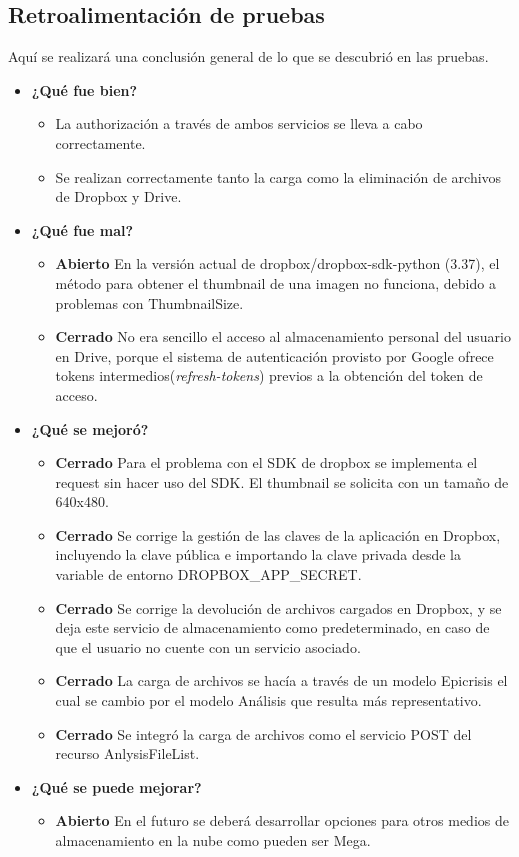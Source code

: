 \subsection{Retroalimentación de pruebas}
Aquí se realizará una conclusión general de lo que se descubrió en las pruebas.
	\begin{itemize}
		\item \textbf{¿Qué fue bien?}
        	\begin{itemize}
				\item La authorización a través de ambos servicios se lleva a cabo correctamente.
				\item Se realizan correctamente tanto la carga como la eliminación de archivos de Dropbox y Drive.
			\end{itemize}
		\item \textbf{¿Qué fue mal?}
        	\begin{itemize}
	          \item \textbf{Abierto} En la versión actual de dropbox/dropbox-sdk-python (3.37), el método para obtener el thumbnail de una imagen no funciona, debido a problemas con ThumbnailSize.
	          \item \textbf{Cerrado} No era sencillo el acceso al almacenamiento personal del usuario en Drive, porque el sistema de autenticación provisto por Google ofrece tokens intermedios(\textit{refresh-tokens}) previos a la obtención del token de acceso.
			\end{itemize}

   		\item \textbf{¿Qué se mejoró?}
        	\begin{itemize}
                \item \textbf{Cerrado} Para el problema con el SDK de dropbox se implementa el request sin hacer uso del SDK. El thumbnail se solicita con un tamaño de 640x480.
                \item \textbf{Cerrado} Se corrige la gestión de las claves de la aplicación en Dropbox, incluyendo la clave pública e importando la clave privada desde la variable de entorno DROPBOX\_APP\_SECRET.
                \item \textbf{Cerrado} Se corrige la devolución de archivos cargados en Dropbox, y se deja este servicio de almacenamiento como predeterminado, en caso de que el usuario no cuente con un servicio asociado.
                \item \textbf{Cerrado} La carga de archivos se hacía a través de un modelo Epicrisis el cual se cambio por el modelo Análisis que resulta más representativo.
                \item \textbf{Cerrado} Se integró la carga de archivos como el servicio POST del recurso AnlysisFileList.
			\end{itemize}

   		\item \textbf{¿Qué se puede mejorar?}
        	\begin{itemize}
		        \item \textbf{Abierto} En el futuro se deberá desarrollar opciones para otros medios de almacenamiento en la nube como pueden ser Mega.
            \end{itemize}
        

	\end{itemize}